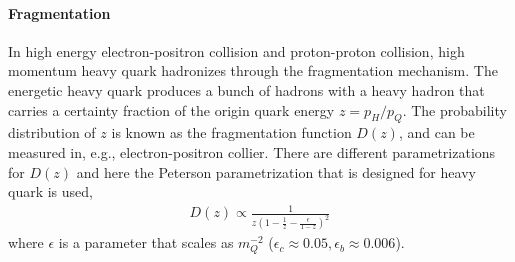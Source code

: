 \paragraph{Fragmentation} 
In high energy electron-positron collision and proton-proton collision, high momentum heavy quark hadronizes through the fragmentation mechanism.
The energetic heavy quark produces a bunch of hadrons with a heavy hadron that carries a certainty fraction of the origin quark energy $z = p_H/p_Q$.
The probability distribution of $z$ is known as the fragmentation function $D(z)$, and can be measured in, e.g., electron-positron collier.
There are different parametrizations for $D(z)$ and here the Peterson parametrization that is designed for heavy quark is used,
\begin{eqnarray}
D(z) \propto \frac{1}{z(1-\frac{1}{z} - \frac{\epsilon}{1-z})^2}
\end{eqnarray}
where $\epsilon$ is a parameter that scales as $m_Q^{-2}$ ($\epsilon_c \approx 0.05, \epsilon_b \approx 0.006$).

